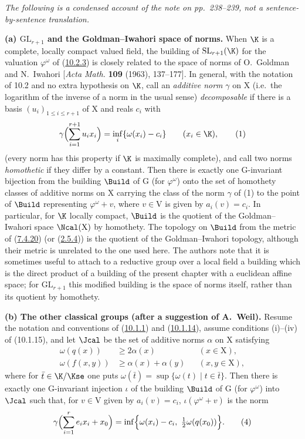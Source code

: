\documentclass[12pt,a4paper,oneside,english]{smfart}
\newcommand{\btref}[1]{\hyperlink{bt:#1}{#1}}
\theoremstyle{definition}
\theoremstyle{bt}
\begin{document}
\noindent\small
\emph{The following is a condensed account of the note on pp.~238--239, not a
sentence-by-sentence translation.}
\normalsize

\medskip
\noindent
\textbf{(a) $\mathrm{GL}_{r+1}$ and the Goldman--Iwahori space of norms.}
When $\K$ is a complete, locally compact valued field, the building of
$\mathrm{SL}_{r+1}(\K)$ for the valuation $\varphi^{\omega}$ of (\btref{10.2.3}) is
closely related to the space of norms of O.~Goldman and N.~Iwahori
[\emph{Acta Math.} \textbf{109} (1963), 137--177]. In general, with the notation
of 10.2 and no extra hypothesis on $\K$, call an \emph{additive norm} $\gamma$
on $\mathrm{X}$ (i.e.\ the logarithm of the inverse of a norm in the usual
sense) \emph{decomposable} if there is a basis
$(u_i)_{1\leqslant i\leqslant r+1}$ of $\mathrm{X}$ and reals $c_i$ with
\begin{equation*}
\gamma\Bigl(\sum_{i=1}^{r+1}u_i x_i\Bigr)=\inf_i\{\omega(x_i)-c_i\}
\qquad (x_i\in\K),
\tag{1}
\end{equation*}
(every norm has this property if $\K$ is maximally complete), and call two norms
\emph{homothetic} if they differ by a constant. Then there is exactly one
$\mathrm{G}$-invariant bijection from the building $\Build$ of $\mathrm{G}$ (for
$\varphi^{\omega}$) onto the set of homothety classes of additive norms on
$\mathrm{X}$ carrying the class of the norm $\gamma$ of (1) to the point of
$\Build$ representing $\varphi^{\omega}+v$, where $v\in\mathrm{V}$ is given by
$a_i(v)=c_i$. In particular, for $\K$ locally compact, $\Build$ is the quotient
of the Goldman--Iwahori space $\Ncal(\mathrm{X})$ by homothety. The topology on
$\Build$ from the metric of (\btref{7.4.20}) (or (\btref{2.5.4})) is the quotient of the
Goldman--Iwahori topology, although their metric is unrelated to the one used
here. The authors note that it is sometimes useful to attach to a reductive
group over a local field a building which is the direct product of a building of
the present chapter with a euclidean affine space; for $\mathrm{GL}_{r+1}$ this
modified building is the space of norms itself, rather than its quotient by
homothety.

\medskip
\noindent
\textbf{(b) The other classical groups (after a suggestion of A.~Weil).}
Resume the notation and conventions of (\btref{10.1.1}) and (\btref{10.1.14}), assume conditions
(i)--(iv) of (10.1.15), and let $\Jcal$ be the set of additive norms $\alpha$ on
$\mathrm{X}$ satisfying
\begin{align}
\omega(q(x))&\geqslant 2\alpha(x) && (x\in\mathrm{X}),\tag{2}\\
\omega(f(x,y))&\geqslant \alpha(x)+\alpha(y) && (x,y\in\mathrm{X}),\tag{3}
\end{align}
where for $\bar t\in\K/\Kse$ one puts $\omega(\bar t)=\sup\{\omega(t)\mid t\in\bar t\}$.
Then there is exactly one $\mathrm{G}$-invariant injection $\iota$ of the
building $\Build$ of $\mathrm{G}$ (for $\varphi^{\omega}$) into $\Jcal$ such
that, for $v\in\mathrm{V}$ given by $a_i(v)=c_i$, $\iota(\varphi^{\omega}+v)$ is
the norm
\begin{equation*}
\gamma\Bigl(\sum_{i=1}^{r} e_i x_i+x_0\Bigr)
=\inf\Bigl\{\omega(x_i)-c_i,\ \tfrac12\omega(q(x_0))\Bigr\}.
\tag{4}
\end{equation*}
\end{document}
